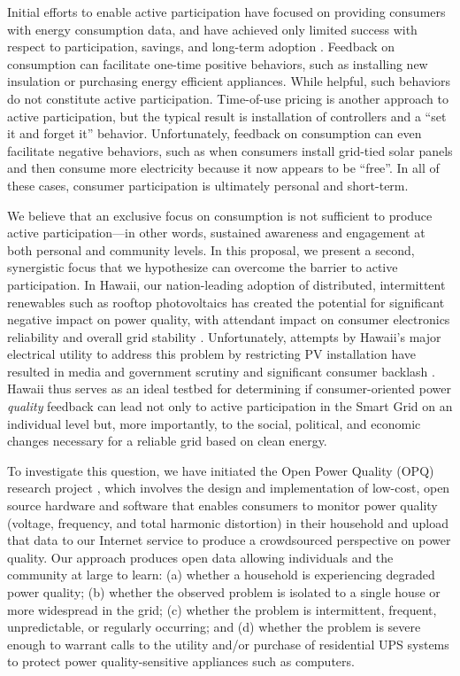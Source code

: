 Initial efforts to enable active participation have focused on providing consumers with energy consumption data, and have achieved only limited success with respect to participation, savings, and long-term adoption \cite{Darby06,Faruqui09,Foster2012}.  Feedback on consumption can facilitate one-time positive behaviors, such as installing new insulation or purchasing energy efficient appliances. While helpful, such behaviors do not constitute active participation.    Time-of-use pricing is another approach to active participation, but the typical result is installation of controllers and a ``set it and forget it'' behavior.  Unfortunately, feedback on consumption can even facilitate negative behaviors, such as when consumers install grid-tied solar panels and then consume more electricity because it now appears to be ``free''.  In all of these cases, consumer participation is ultimately personal and short-term.

We believe that an exclusive focus on consumption is not sufficient to produce active participation---in other words, sustained awareness and engagement at both personal and community levels. In this proposal, we present a second, synergistic focus that we hypothesize can overcome the barrier to active participation.  In Hawaii, our nation-leading adoption of distributed, intermittent renewables such as rooftop photovoltaics has created the potential for significant negative impact on power quality, with attendant impact on consumer electronics reliability and overall grid stability \cite{Rodriguez2010,Laskar2012}. Unfortunately, attempts by Hawaii's major electrical utility to address this problem by restricting PV installation have resulted in media and government scrutiny and significant consumer backlash \cite{Yonan2013,Zunin2013,Elston2013,Cocke2013,Cocke2012}.  Hawaii thus serves as an ideal testbed for determining if consumer-oriented power {\em quality} feedback can lead not
only to active participation in the Smart Grid on an individual level but, more importantly, to the social, political, and economic changes necessary for a reliable grid based on clean energy.

To investigate this question, we have initiated the Open Power Quality (OPQ) research project \cite{opq-site}, which involves the design and implementation of low-cost, open source hardware and software that enables consumers to monitor power quality (voltage, frequency, and total harmonic distortion) in their household and upload that data to our Internet service to produce a crowdsourced perspective on power quality.  Our approach produces open data allowing individuals and the community at large to learn: (a) whether a household is experiencing degraded power quality; (b) whether the observed problem is isolated to a single house or more widespread in the grid;  (c) whether the problem is intermittent, frequent, unpredictable, or regularly occurring;  and (d) whether the problem is severe enough to warrant calls to the utility and/or purchase of residential UPS systems to protect power quality-sensitive appliances such as computers. 

